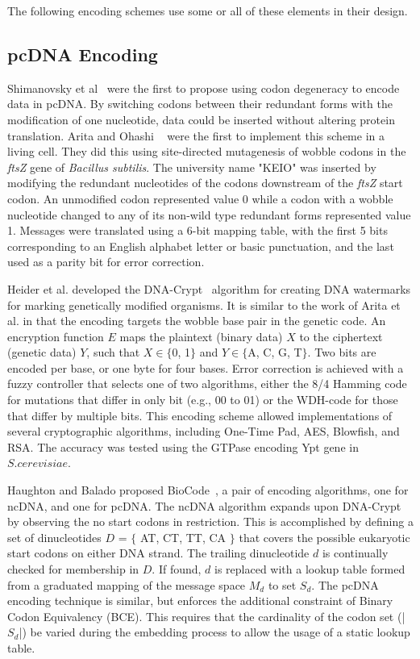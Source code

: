\documentclass[USenglish,oneside,twocolumn]{article}
\begin{document}
The following encoding schemes use some or all of these elements in their design.

\subsection{pcDNA Encoding}

Shimanovsky et al~\cite{SFHC2003BL} were the first to propose using codon degeneracy to encode data in pcDNA. By switching codons between their redundant forms with the modification of one nucleotide, data could be inserted without altering protein translation. Arita and Ohashi ~\cite{AY2004BP} were the first to implement this scheme in a living cell. They did this using site-directed mutagenesis of wobble codons in the \textit{ftsZ} gene of \textit{Bacillus subtilis}. The university name "KEIO" was inserted by modifying the redundant nucleotides of the codons downstream of the \textit{ftsZ} start codon. An unmodified codon represented value 0 while a codon with a wobble nucleotide changed to any of its non-wild type redundant forms represented value 1. Messages were translated using a 6-bit mapping table, with the first 5 bits corresponding to an English alphabet letter or basic punctuation, and the last used as a parity bit for error correction.

Heider et al. developed the DNA-Crypt~\cite{HBBMC2007} algorithm for creating DNA watermarks for marking genetically modified organisms. It is similar to the work of Arita et al. in that the encoding targets the wobble base pair in the genetic code. An encryption function $E$ maps the plaintext (binary data) $X$ to the ciphertext (genetic data) $Y$, such that $X \in  \{$0, 1$\}$ and $Y \in \{$A, C, G, T$\}$. Two bits are encoded per base, or one byte for four bases. Error correction is achieved with a fuzzy controller that selects one of two algorithms, either the 8/4 Hamming code for mutations that differ in only bit (e.g., 00 to 01) or the WDH-code for those that differ by multiple bits. This encoding scheme allowed implementations of several cryptographic algorithms, including One-Time Pad, AES, Blowfish, and RSA. The accuracy was tested using the GTPase encoding Ypt gene in $S. cerevisiae$.

Haughton and Balado proposed BioCode~\cite{HBBMC2013}, a pair of encoding algorithms, one for ncDNA, and one for pcDNA. The ncDNA algorithm expands upon DNA-Crypt by observing the no start codons in restriction. This is accomplished by defining a set of dinucleotides $D$ = $\{$ AT, CT, TT, CA $\}$ that covers the possible eukaryotic start codons on either DNA strand. The trailing dinucleotide $d$ is continually checked for membership in $D$. If found, $d$ is replaced with a lookup table formed from a graduated mapping of the message space $M_d$ to set $S_d$. The pcDNA encoding technique is similar, but enforces the additional constraint of Binary Codon Equivalency (BCE). This requires that the cardinality of the codon set (|$S_d$|) be varied during the embedding process to allow the usage of a static lookup table.
\end{document}
